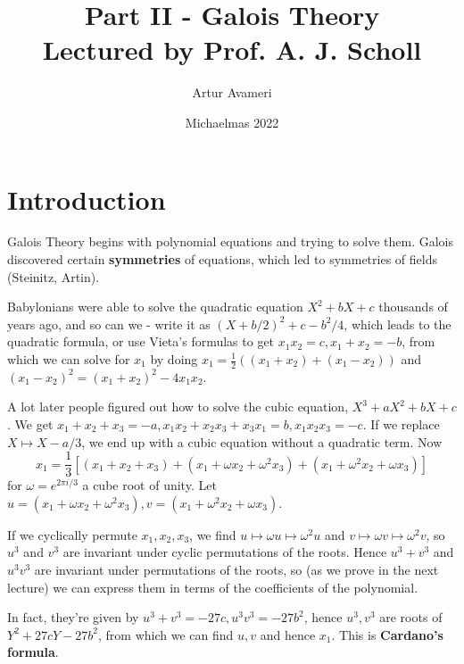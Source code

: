 \documentclass{article}
\title{ Part II - Galois Theory
    \\ \large
Lectured by Prof. A. J. Scholl
}
\author{Artur Avameri}
\date{Michaelmas 2022}
\theoremstyle{definition}
\begin{document}
\maketitle
\tableofcontents
\newpage

\section{Introduction}



Galois Theory begins with polynomial equations and trying to solve them. Galois discovered certain \textbf{symmetries} of equations, which led to symmetries of fields (Steinitz, Artin).

\vspace{1mm}


Babylonians were able to solve the quadratic equation $X^2 + bX + c$ thousands of years ago, and so can we - write it as $(X + b/2)^2 + c - b^2/4$, which leads to the quadratic formula, or use Vieta's formulas to get $x_1x_2 = c, x_1 + x_2 = -b$, from which we can solve for $x_1$ by doing $x_1 = \frac{1}{2} \left( (x_1 + x_2) + (x_1 - x_2) \right)$ and $(x_1 - x_2)^2 = (x_1 + x_2)^2 - 4x_1x_2$.

\vspace{1mm}


A lot later people figured out how to solve the cubic equation, $X^3 + aX^2 +bX + c$. We get $x_1 + x_2 + x_3 = -a, x_1x_2 + x_2x_3 + x_3x_1 = b, x_1x_2x_3 = -c$. If we replace $X \mapsto X- a/3$, we end up with a cubic equation without a quadratic term. Now \[
x_1 = \frac{1}{3}\left[(x_1+x_2+x_3) + (x_1 + \omega x_2 + \omega^2 x_3) + (x_1 + \omega^2 x_2 + \omega x_3) \right]
\] for $\omega = e^{2\pi i/3}$ a cube root of unity. Let $u = (x_1 + \omega x_2 + \omega^2 x_3), v = (x_1 + \omega^2 x_2 + \omega x_3)$.

If we cyclically permute $x_1,x_2,x_3$, we find $u \mapsto \omega u \mapsto \omega^2 u$ and $v \mapsto \omega v \mapsto \omega^2 v$, so $u^3$ and $v^3$ are invariant under cyclic permutations of the roots. Hence $u^3+v^3$ and $u^3v^3$ are invariant under permutations of the roots, so (as we prove in the next lecture) we can express them in terms of the coefficients of the polynomial.

In fact, they're given by $u^3 + v^3 = -27c, u^3v^3 = -27b^2$, hence $u^3,v^3$ are roots of $Y^2 + 27cY - 27b^2$, from which we can find $u,v$ and hence $x_1$. This is \textbf{Cardano's formula}.
\end{document}
